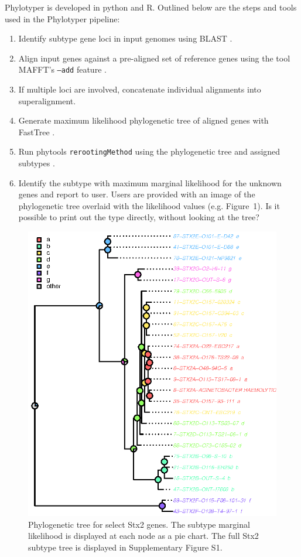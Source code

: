 \documentclass{bioinfo}
\begin{document}
Phylotyper is developed in python and R. 
Outlined below are the steps and tools used in the Phylotyper pipeline:

\begin{enumerate}
\item Identify subtype gene loci in input genomes using BLAST \citep{Camacho2009}.
\item Align input genes against a pre-aligned set of reference genes using the tool MAFFT's \texttt{--add} feature \citep{Katoh2013,CapellaGutierrez2009}.
\item If multiple loci are involved, concatenate individual alignments into superalignment.
\item Generate maximum likelihood phylogenetic tree of aligned genes with FastTree \citep{Price2010}.
\item Run phytools \texttt{rerootingMethod} using the phylogenetic tree and assigned subtypes \citep{Revell2011}.
\item Identify the subtype with maximum marginal likelihood for the unknown genes and report to user.
Users are provided with an image of the phylogenetic tree overlaid with the likelihood values (e.g. Figure~1\vphantom{\ref{fig:01}}). {Is it possible to print out the type directly, without looking at the tree?}
\end{enumerate}

\begin{figure}[!tpb]%
\centerline{\includegraphics{fig01.eps}}
\caption{Phylogenetic tree for select Stx2 genes. 
The subtype marginal likelihood is displayed at each node as a pie chart.
The full Stx2 subtype tree is displayed in Supplementary Figure S1.}\label{fig:01}
\end{figure}
\end{document}
